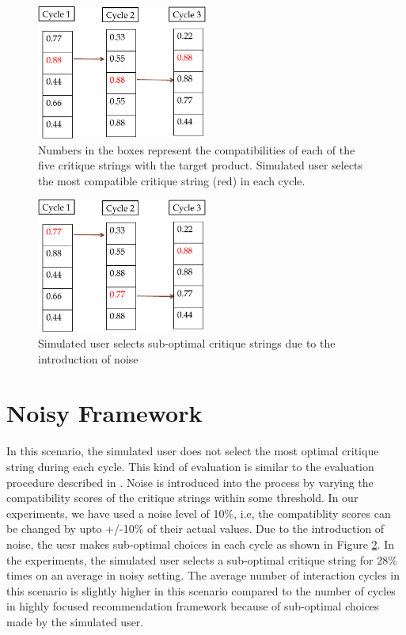 \begin{figure}[h]
  \centering
  \captionsetup{justification=centering}
    \includegraphics[width=0.5\textwidth]{figures-bharath/focus.pdf}
  \caption{Numbers in the boxes represent the compatibilities of each of the five critique strings with the target product. Simulated user selects the most compatible critique string (red) in each cycle.}
\label{fig:focus}
\end{figure}

\begin{figure}[h]
  \centering
  \captionsetup{justification=centering}
    \includegraphics[width=0.5\textwidth]{figures-bharath/noisy.pdf}
  \caption{Simulated user selects sub-optimal critique strings due to the introduction of noise}
\label{fig:noisy}
\end{figure}

\section{Noisy Framework}
\label{sec:noisy}
In this scenario, the simulated user does not select the most optimal critique string during each cycle.
This kind of evaluation is similar to the evaluation procedure described in \cite{suggestion}.
Noise is introduced into the process by varying the compatibility scores of the critique strings within some threshold. 
In our experiments, we have used a noise level of 10\%, i.e, the compatiblity scores can be changed by upto +/-10\% of their actual values.
Due to the introduction of noise, the uesr makes sub-optimal choices in each cycle as shown in Figure \ref{fig:noisy}.
In the experiments, the simulated user selects a sub-optimal critique string for 28\% times on an average in noisy setting.
The average number of interaction cycles in this scenario is slightly higher in this scenario compared to the number of cycles in highly focused recommendation framework because of sub-optimal choices made by the simulated user.


